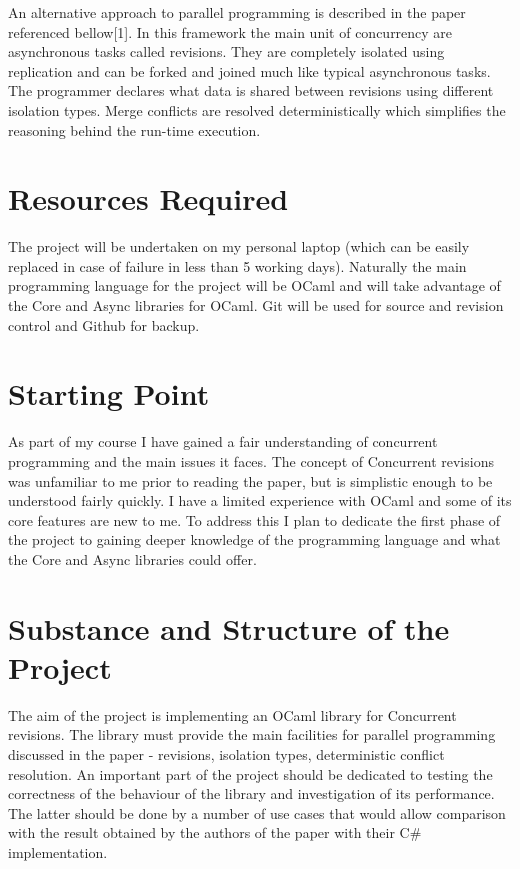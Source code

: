An alternative approach to parallel programming is described in the paper referenced bellow[1]. In this framework the main unit of concurrency are asynchronous tasks called revisions. They are completely isolated using replication and can be forked and joined much like typical asynchronous tasks. The programmer declares what data is shared between revisions using different isolation types. Merge conflicts are resolved deterministically which simplifies the reasoning behind the run-time execution. 

\section*{Resources Required}

The project will be undertaken on my personal laptop (which can be easily replaced in case of failure in less than 5 working days). Naturally the main programming language for the project will be OCaml and will take advantage of the Core and Async libraries for OCaml. Git will be used for source and revision control and Github for backup.

\section*{Starting Point}

As part of my course I have gained a fair understanding of concurrent programming and the main issues it faces. The concept of Concurrent revisions was unfamiliar to me prior to reading the paper, but is simplistic enough to be understood fairly quickly. I have a limited experience with OCaml and some of its core features are new to me. To address this I plan to dedicate the first phase of the project to gaining deeper knowledge of the programming language and what the Core and Async libraries could offer.

\section*{Substance and Structure of the Project}

The aim of the project is implementing an OCaml library for Concurrent revisions. The library must provide the main facilities for parallel programming discussed in the paper - revisions, isolation types, deterministic conflict resolution. An important part of the project should be dedicated to testing the correctness of the behaviour of the library and investigation of its performance. The latter should be done by a number of use cases that would allow comparison with the result obtained by the authors of the paper with their C\# implementation.


